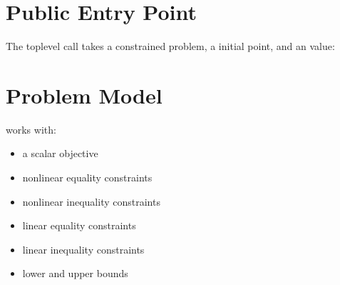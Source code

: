 \documentclass[letterpaper,10pt,english]{sphinxmanual}
\begin{document}
\section{Public Entry Point}
\label{\detokenize{optima_algorithms:public-entry-point}}
\sphinxAtStartPar
The top\sphinxhyphen{}level call takes a constrained problem, a  initial point, and an  value:

\begin{sphinxVerbatim}[commandchars=\\\{\}]


\end{sphinxVerbatim}


\section{Problem Model}
\label{\detokenize{optima_algorithms:problem-model}}
\sphinxAtStartPar
{} works with:
\begin{itemize}
\item {} 
\sphinxAtStartPar
a scalar objective

\item {} 
\sphinxAtStartPar
nonlinear equality constraints

\item {} 
\sphinxAtStartPar
nonlinear inequality constraints

\item {} 
\sphinxAtStartPar
linear equality constraints

\item {} 
\sphinxAtStartPar
linear inequality constraints

\item {} 
\sphinxAtStartPar
lower and upper bounds

\end{itemize}
\end{document}

